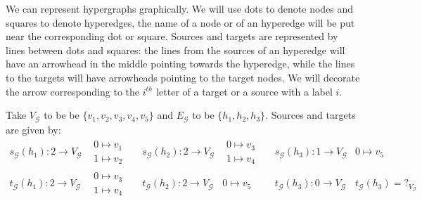 \documentclass[a4paper,UKenglish,cleveref,pdftex,thm-restate,numberwithinsect]{lipics-v2021}
\begin{document}
We can represent hypergraphs graphically. We will use dots to denote nodes and squares to denote hyperedges, the name of a node or of an hyperedge will be put near the corresponding dot or square. Sources and targets are represented by lines between dots and squares: the lines from the sources of an hyperedge will have an arrowhead in the middle pointing towards the hyperedge, while the lines to the targets will have arrowheads pointing to the target nodes.  We will decorate the arrow corresponding to the $i^{th}$ letter of a target or a source with a label $i$.
\iffalse 
\begin{example}Take $V_{\mathcal{G}}$ to be be $\{v_1, v_2, v_3, v_4, v_5\}$ and $E_{\mathcal{G}}$ to be $\{h_1, h_2, h_3\}$. Sources and targets are given by:
	\[\begin{matrix}
		s_{\mathcal{G}}(h_1)\colon 2\to V_{\mathcal{G}}  & \begin{matrix}
			0 \mapsto v_1\\
			1\mapsto v_2
		\end{matrix} && s_{\mathcal{G}}(h_2)\colon 2\to V_{\mathcal{G}} & \begin{matrix}
			0 \mapsto v_3\\
			1\mapsto v_4 
		\end{matrix} && s_{\mathcal{G}}(h_3)\colon 1\to V_{\mathcal{G}} & 
		0 \mapsto v_5\\
		t_{\mathcal{G}}(h_1)\colon 2\to V_{\mathcal{G}} & \begin{matrix}
			0 \mapsto v_3\\
			1\mapsto v_4
		\end{matrix} && t_{\mathcal{G}}(h_2)\colon 2\to V_{\mathcal{G}} & 0\mapsto v_5 && t_{\mathcal{G}}(h_3)\colon 0\to V_{\mathcal{G}} &  t_{\mathcal{G}}(h_3)=?_{ V_{\mathcal{G}}} 
	\end{matrix}\]
	

\end{example}
\end{document}
